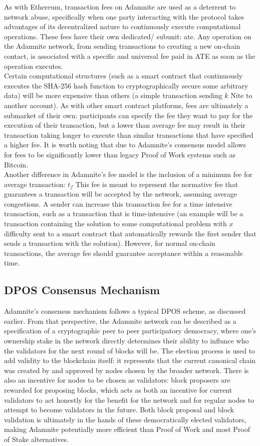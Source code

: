 \documentclass[conference]{IEEEtran}
\begin{document}
As with Ethereum, transaction fees on Adamnite are used as a deterrent to network abuse, specifically when one party interacting with the protocol takes advantages of its decentralized nature to continuously execute computational operations. These fees have their own dedicated/ subunit: ate. Any operation on the Adamnite network, from sending transactions to creating a new on-chain contact, is associated with a specific and universal fee paid in ATE as soon as the operation executes.\\
Certain computational structures (such as a smart contract that continuously executes the SHA-256 hash function to cryptographically secure some arbitrary data) will be more expensive than others (a simple transaction sending $k$ Nite to another account). As with other smart contract platforms, fees are ultimately a submarket of their own: participants can specify the fee they want to pay for the execution of their transaction, but a lower than average fee may result in their transaction taking longer to execute than similar transactions that have specified a higher fee. It is worth noting that due to Adamnite's consensus model allows for fees to be significantly lower than legacy Proof of Work systems such as Bitcoin.\\
Another difference in Adamnite's fee model is the inclusion of a minimum fee for average transaction: $t_f$ This fee is meant to represent the normative fee that guarantees a transaction will be accepted by the network, assuming average congestions. A sender can increase this transaction fee for a time intensive transaction, such as a transaction  that is time-intensive (an example will be a transaction containing the solution to some computational problem with $x$ difficulty sent to a smart contract that automatically rewards the first sender that sends a transaction with the solution). However, for normal on-chain transactions, the average fee should guarantee acceptance within a reasonable time.

\subsection{DPOS Consensus Mechanism}


Adamnite's consensus mechanism follows a typical DPOS scheme, as discussed earlier. From that perspective, the Adamnite network can be described as a specification of a cryptographic peer to peer participatory democracy, where one's ownership stake in the network directly determines their ability to influnce who the validators for the next round of blocks will be. The election process is used to add validity to the blockchain itself: it represents that the current canonical chain was created by and approved by nodes chosen by the broader network. There is also an incentive for nodes to be chosen as validators: block proposers are rewarded for proposing blocks, which acts as both an incentive for current validators to act honestly for the benefit for the network and for regular nodes to attempt to become validators in the future. Both block proposal and block validation is ultimately in the hands of these democratically elected validators, making Adamnite potentially more efficient than Proof of Work and most Proof of Stake alternatives.
\end{document}
